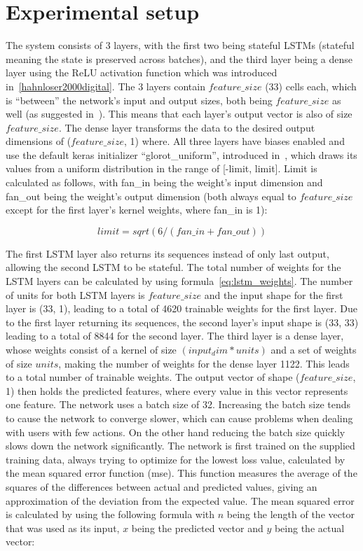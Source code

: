 \section{Experimental setup}
The system consists of 3 layers, with the first two being stateful LSTMs (stateful meaning the state is preserved across batches), and the third layer being a dense layer using the ReLU activation function which was introduced in~\ref{hahnloser2000digital}. The 3 layers contain \(feature\_size\) (33) cells each, which is \enquote{between} the network's input and output sizes, both being \(feature\_size\) as well (as suggested in~\cite{heaton2008introduction}). This means that each layer's output vector is also of size \(feature\_size\). The dense layer transforms the data to the desired output dimensions of (\(feature\_size\), 1) where. All three layers have biases enabled and use the default keras initializer \enquote{glorot\_uniform}, introduced in~\cite{glorot2010understanding}, which draws its values from a uniform distribution in the range of [-limit, limit]. Limit is calculated as follows, with fan\_in being the weight's input dimension and fan\_out being the weight's output dimension (both always equal to \(feature\_size\) except for the first layer's kernel weights, where fan\_in is 1):

\begin{equation}
limit = sqrt(6 / (fan\_in + fan\_out))
\end{equation}

The first LSTM layer also returns its sequences instead of only last output, allowing the second LSTM to be stateful. The total number of weights for the LSTM layers can be calculated by using formula~\ref{eq:lstm_weights}. The number of units for both LSTM layers is \(feature\_size\) and the input shape for the first layer is (33, 1), leading to a total of 4620 trainable weights for the first layer. Due to the first layer returning its sequences, the second layer's input shape is (33, 33) leading to a total of 8844 for the second layer. The third layer is a dense layer, whose weights consist of a kernel of size \((input_dim * units)\) and a set of weights of size \(units\), making the number of weights for the dense layer 1122. This leads to a total number of trainable weights. The output vector of shape (\(feature\_size\), 1) then holds the predicted features, where every value in this vector represents one feature. The network uses a batch size of 32. Increasing the batch size tends to cause the network to converge slower, which can cause problems when dealing with users with few actions. On the other hand reducing the batch size quickly slows down the network significantly. The network is first trained on the supplied training data, always trying to optimize for the lowest loss value, calculated by the mean squared error function (mse). This function measures the average of the squares of the differences between actual and predicted values, giving an approximation of the deviation from the expected value. The mean squared error is calculated by using the following formula with \(n\) being the length of the vector that was used as its input, \(x\) being the predicted vector and \(y\) being the actual vector:

